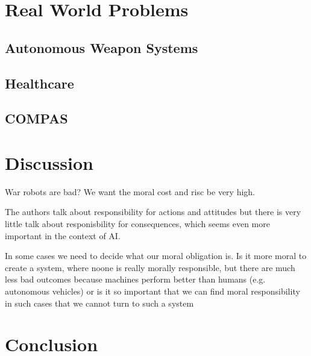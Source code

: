 \documentclass{article}
\newcounter{example}[section]
\begin{document}
%
%
%
%

\section{Real World Problems}
\subsection{Autonomous Weapon Systems}
\subsection{Healthcare}
\subsection{COMPAS}
\section{Discussion}
War robots are bad? We want the moral cost and risc be very high.

The authors talk about responsibility for actions and attitudes but there is
very little talk about responisbility for consequences, which seems even more
important in the context of AI.

In some cases we need to decide what our moral obligation is. Is it more moral
to create a system, where noone is really morally responsible, but there are
much less bad outcomes because machines perform better than humans (e.g.
autonomous vehicles) or is it so important that we can find moral responsibility
in such cases that we cannot turn to such a system
\section{Conclusion}
\end{document}
